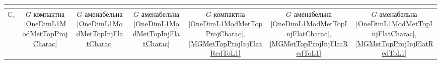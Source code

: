 \documentclass{article}
\numberwithin{equation}{section}
\theoremstyle{plain}
\theoremstyle{definition}
\begin{document}
\begin{fulltext}
\begin{table}[ht]
\begin{tiny}
{\begin{tabular}{|c|c|c|c|c|c|c|}
{    			} \\ 
            \hline
                $\mathbb{C}_\gamma$ & 
    			\shortstack{
    				$G$ компактна \\ 
    				\ref{OneDimL1ModMetTopProjCharac}
    			} & 
    			\shortstack{
    				$G$ аменабельна \\ 
    				\ref{OneDimL1ModMetTopInjFlatCharac}
    			} & 
    			\shortstack{
    				$G$ аменабельна \\ 
    				\ref{OneDimL1ModMetTopInjFlatCharac}
    			} & 
    			\shortstack{
    				$G$ компактна \\ 
    				\ref{OneDimL1ModMetTopProjCharac},
    				\ref{MGMetTopProjInjFlatRedToL1}
    			} & 
    			\shortstack{
    				$G$ аменабельна \\ 
    				\ref{OneDimL1ModMetTopInjFlatCharac},
    				\ref{MGMetTopProjInjFlatRedToL1}
    			} & 
    			\shortstack{
    				$G$ аменабельна \\ 
    				\ref{OneDimL1ModMetTopInjFlatCharac},
    				\ref{MGMetTopProjInjFlatRedToL1}
    			} \\                   
            \hline
            \end{tabular}
        }
    \end{tiny}
    \label{HomolTrivModMetTh}
\end{table}


\end{fulltext}
\end{document}
